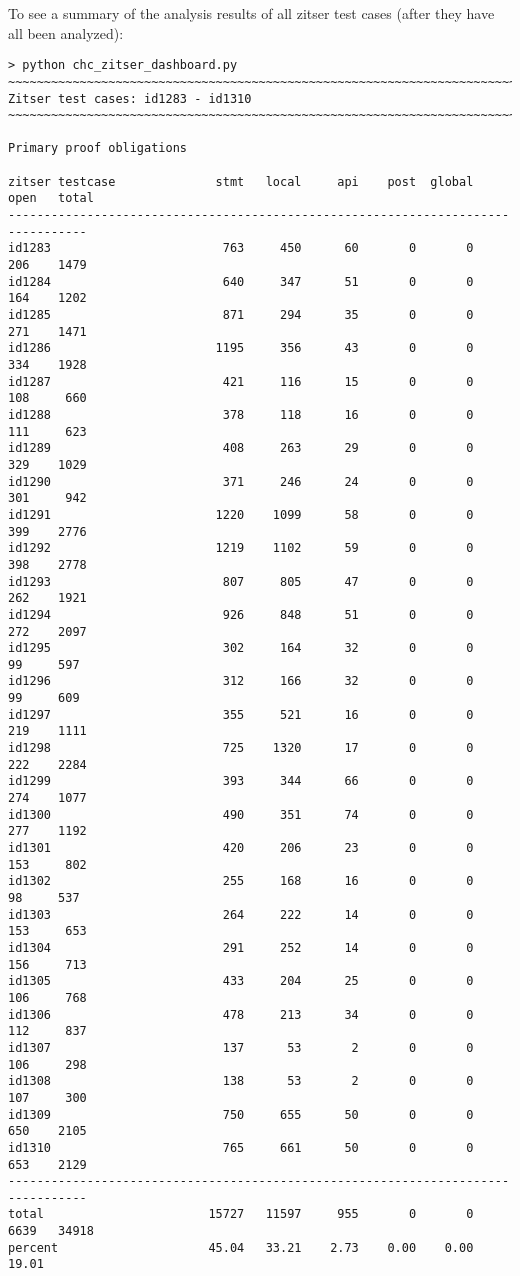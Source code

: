 \documentclass[11pt]{article}
\begin{document}
To see a summary of the analysis results of all zitser test cases (after they have
all been analyzed):
\begin{small}
\begin{verbatim}
> python chc_zitser_dashboard.py
~~~~~~~~~~~~~~~~~~~~~~~~~~~~~~~~~~~~~~~~~~~~~~~~~~~~~~~~~~~~~~~~~~~~~~~~~~~~~~~~
Zitser test cases: id1283 - id1310
~~~~~~~~~~~~~~~~~~~~~~~~~~~~~~~~~~~~~~~~~~~~~~~~~~~~~~~~~~~~~~~~~~~~~~~~~~~~~~~~

Primary proof obligations

zitser testcase              stmt   local     api    post  global    open   total
---------------------------------------------------------------------------------
id1283                        763     450      60       0       0     206    1479
id1284                        640     347      51       0       0     164    1202
id1285                        871     294      35       0       0     271    1471
id1286                       1195     356      43       0       0     334    1928
id1287                        421     116      15       0       0     108     660
id1288                        378     118      16       0       0     111     623
id1289                        408     263      29       0       0     329    1029
id1290                        371     246      24       0       0     301     942
id1291                       1220    1099      58       0       0     399    2776
id1292                       1219    1102      59       0       0     398    2778
id1293                        807     805      47       0       0     262    1921
id1294                        926     848      51       0       0     272    2097
id1295                        302     164      32       0       0      99     597
id1296                        312     166      32       0       0      99     609
id1297                        355     521      16       0       0     219    1111
id1298                        725    1320      17       0       0     222    2284
id1299                        393     344      66       0       0     274    1077
id1300                        490     351      74       0       0     277    1192
id1301                        420     206      23       0       0     153     802
id1302                        255     168      16       0       0      98     537
id1303                        264     222      14       0       0     153     653
id1304                        291     252      14       0       0     156     713
id1305                        433     204      25       0       0     106     768
id1306                        478     213      34       0       0     112     837
id1307                        137      53       2       0       0     106     298
id1308                        138      53       2       0       0     107     300
id1309                        750     655      50       0       0     650    2105
id1310                        765     661      50       0       0     653    2129
---------------------------------------------------------------------------------
total                       15727   11597     955       0       0    6639   34918
percent                     45.04   33.21    2.73    0.00    0.00   19.01


\end{verbatim}
\end{small}
\end{document}
